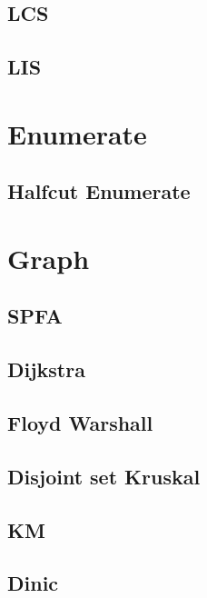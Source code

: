         \subsection{LCS}
                
        \subsection{LIS}
                  

\section{Enumerate} 
        \subsection{Halfcut Enumerate}
                

\section{Graph}
        \subsection{SPFA}
                
        \subsection{Dijkstra}
                
        \subsection{Floyd Warshall}
                
        \subsection{Disjoint set Kruskal}
                
        \subsection{KM}
                
        \subsection{Dinic}
                
